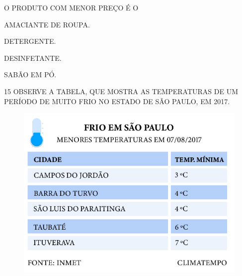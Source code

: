 \bigskip


O PRODUTO COM MENOR PREÇO É O

\begin{escolha}[itemsep=0pt]
\item AMACIANTE DE ROUPA.

\item DETERGENTE.

\item DESINFETANTE.

\item SABÃO EM PÓ.
\end{escolha}

\num{15} OBSERVE A TABELA, QUE MOSTRA AS TEMPERATURAS DE UM PERÍODO DE MUITO FRIO NO ESTADO DE SÃO
PAULO, EM 2017.


\begin{figure}[H]
\includegraphics[width=\textwidth]{./media/SAEB_1ANO_MAT_FIGURA119.png}
\end{figure}

